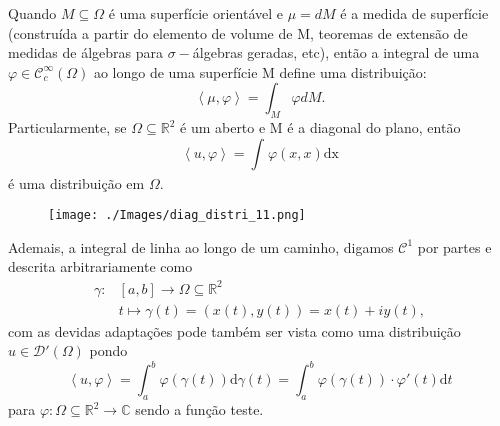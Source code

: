 \documentclass[../distribution_theory_notes.tex]{subfiles}
\begin{document}
 \begin{example}
   Quando \(M\subseteq \Omega \) é uma superfície orientável e \(\mu =dM\) é a medida de superfície (construída a partir do elemento de volume de M, teoremas de extensão de medidas de álgebras para \(\sigma-\)álgebras geradas, etc), então a integral de uma \(\varphi \in \mathcal{C}_{c}^{\infty}(\Omega )\) ao longo de uma superfície M define uma distribuição: 
     \[ 
       \left< \mu , \varphi  \right>=\int_{M}\varphi  dM.
     \]
     Particularmente, se \(\Omega \subseteq \mathbb{R}^{2}\) é um aberto e M é a diagonal do plano, então 
       \[
         \left< u, \varphi  \right>= \int_{}^{}\varphi (x, x) \mathrm{dx}
       \]
       é uma distribuição em \(\Omega \).
      \begin{figure}[H]
      \begin{center}
      \texttt{[image: ./Images/diag\_distri\_11.png]}
      \end{center}
      \end{figure}

      Ademais, a integral de linha ao longo de um caminho, digamos \(\mathcal{C}^{1}\) por partes e descrita arbitrariamente como 
     \begin{align*}
 \gamma:&[a, b]\rightarrow \Omega \subseteq \mathbb{R}^{2} \\
        &t\longmapsto \gamma (t)=(x(t), y(t)) = x(t)+iy(t),
     \end{align*}
  com as devidas adaptações pode também ser vista como uma distribuição \(u\in \mathcal{D}'(\Omega )\) pondo 
    \[
      \left< u, \varphi  \right> = \int_{a}^{b}\varphi (\gamma (t)) \mathrm{d}\gamma (t) = \int_{a}^{b}\varphi (\gamma (t))\cdot \varphi'(t)\mathrm{d}t
    \]
    para \(\varphi :\Omega  \subseteq \mathbb{R}^{2}\rightarrow \mathbb{C}\) sendo a função teste.
 \end{example}
\end{document}
